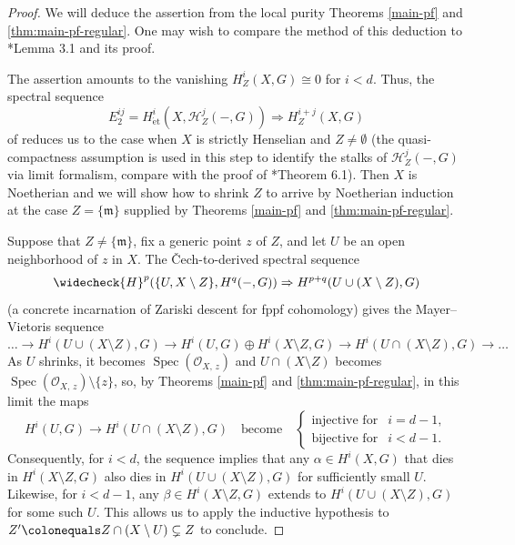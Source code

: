 \documentclass[11pt, reqno]{amsart}
\newcommand{\gA}{\alpha}
\newcommand{\gB}{\beta}
\newcommand{\cH}{\mathcal{H}}
\newcommand{\fm}{\mathfrak{m}}
\newcommand{\sO}{\mathscr{O}}
\DeclareMathOperator{\Spec}{Spec}		%
\newcommand{\ce}{\colonequals}
\newcommand{\et}{\mathrm{\acute{e}t}}	%
\newcommand{\ra}{\rightarrow}
\newcommand{\Ra}{\Rightarrow}
\newcommand{\x}{\text}
\providecommand{\qxq}[1]{\quad\text{#1}\quad}
\newcommand{\bpf}{\begin{proof}}
\newcommand{\epf}{\end{proof}}
\numberwithin{equation}{numberingbase}
\theoremstyle{thms}
\theoremstyle{claims}
\theoremstyle{defs}
\theoremstyle{thms}
\theoremstyle{defs}
\theoremstyle{subsection-tweak}
\theoremstyle{subsection-tweak}
\begin{document}
\bpf
We will deduce the assertion from the local purity Theorems \ref{main-pf} and \ref{thm:main-pf-regular}. One may wish to compare the method of this deduction to \cite{Gab04a}*{Lemma 3.1 and its proof}.

The assertion amounts to the vanishing $H^i_Z(X, G) \cong 0$ for $i < d$. Thus, the  spectral sequence
\[
E_2^{ij} = H^i_\et(X, \cH^j_Z(-, G)) \Ra H^{i + j}_Z(X, G)
\]
of  reduces us to the case when $X$ is strictly Henselian and $Z \neq \emptyset$ (the quasi-compactness assumption is used in this step to identify the stalks of $\cH^j_Z(-, G)$ via limit formalism, compare with the proof of \cite{brauer-purity}*{Theorem 6.1}). Then $X$ is Noetherian and we will show how to shrink $Z$ to arrive by Noetherian induction at the case $Z = \{\fm\}$ supplied by Theorems \ref{main-pf} and \ref{thm:main-pf-regular}.

Suppose that $Z \neq \{\fm\}$, fix a generic point $z$ of $Z$, and let $U$ be an open neighborhood of $z$ in $X$. The \v{C}ech-to-derived spectral sequence  %
\[
\widecheck{H}^p(\{U, X \setminus Z\}, H^q(-, G)) \Ra H^{p+q}(U \cup (X \setminus Z), G)
\]
(a concrete incarnation of Zariski descent for fppf cohomology) gives the Mayer--Vietoris sequence
\[
\dotsc \ra H^i(U \cup (X \setminus Z), G) \ra H^i(U, G) \oplus H^i(X \setminus Z, G) \ra H^i(U \cap (X \setminus Z), G) \ra \dotsc
\]
As $U$ shrinks, it becomes $\Spec(\sO_{X,\, z})$ and $U \cap (X \setminus Z)$ becomes $\Spec(\sO_{X,\, z}) \setminus \{ z\}$, so, by Theorems \ref{main-pf} and \ref{thm:main-pf-regular}, in this limit the maps 
\[
H^i(U, G) \ra H^i(U \cap (X \setminus Z), G) \qxq{become} \begin{cases} \x{injective for}  &i = d - 1, \\ \x{bijective for} & i < d - 1.
\end{cases}
\]
Consequently, for $i < d$, the sequence implies that any $\gA \in H^i(X, G)$  that dies in $H^i(X \setminus Z, G)$ also dies in $H^i(U \cup (X \setminus Z), G)$ for sufficiently small $U$. Likewise, for $i < d - 1$, any $\gB \in H^i(X \setminus Z, G)$ extends to $H^i(U \cup (X \setminus Z), G)$ for some such $U$. This allows us to apply the inductive hypothesis to $Z' \ce Z \cap (X \setminus U) \subsetneq Z$ to conclude.
\epf
\end{document}

